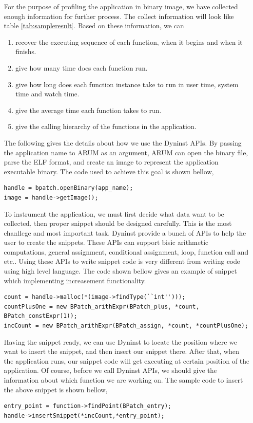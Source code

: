 \documentclass[11pt,letterpaper,oneside]{article}
\begin{document}
For the purpose of profiling the application in binary image, we have collected enough information for further process. The collect information will look like table \ref{tab:sampleresult}. Based on these information, we can
\begin{enumerate}
\item recover the executing sequence of each function, when it begins and when it finishs.
\item give how many time does each function run.
\item give how long does each function instance take to run in user time, system time and watch time.
\item give the average time each function takes to run.
\item give the calling hierarchy of the functions in the application.
\end{enumerate}

The following gives the details about how we use the Dyninst APIs. By passing the application name to ARUM as an argument, ARUM can open the binary file, parse the ELF format, and create an image to represent the application executable binary. The code used to achieve this goal is shown bellow,
\begin{Verbatim}[frame=single]
handle = bpatch.openBinary(app_name);
image = handle->getImage();
\end{Verbatim}

To instrument the application, we must first decide what data want to be collected, then proper snippet should be designed carefully. This is the most chanllege and most important task. Dyninst provide a bunch of APIs to help the user to create the snippets. These APIs can support bisic arithmetic computations, general assignment, conditional assignment, loop, function call and etc.. Using these APIs to write snippet code is very different from writing code using high level language. The code shown bellow gives an example of snippet which implementing increasement functionality.
\begin{Verbatim}[frame=single]
count = handle->malloc(*(image->findType(``int'')));
countPlusOne = new BPatch_arithExpr(BPatch_plus, *count, BPatch_constExpr(1));
incCount = new BPatch_arithExpr(BPatch_assign, *count, *countPlusOne);
\end{Verbatim}

Having the snippet ready, we can use Dyninst to locate the position where we want to insert the snippet, and then insert our snippet there. After that, when the application runs, our snippet code will get executing at certain position of the application. Of course, before we call Dyninst APIs, we should give the information about which function we are working on. The sample code to insert the above snippet is shown bellow,
\begin{Verbatim}[frame=single]
entry_point = function->findPoint(BPatch_entry);
handle->insertSnippet(*incCount,*entry_point);
\end{Verbatim}
\end{document}
